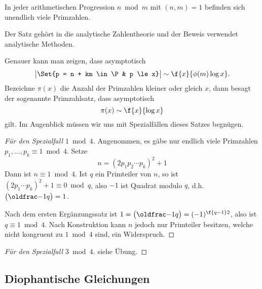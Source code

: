 \begin{st}[Dirichlet] \label{2.17}
	In jeder arithmetischen Progression $n \bmod m$ mit $(n,m) = 1$ befinden sich unendlich viele Primzahlen.
	\begin{note}
		Der Satz gehört in die analytische Zahlentheorie und der Beweis verwendet analytische Methoden.

		Genauer kann man zeigen, dass asymptotisch
		\[
			\big| \Set{p = n + km \in \P & p \le x} \big|
			\sim
			\f {x}{\phi(m) \log x}.
		\]
		Bezeichne $\pi(x)$ die Anzahl der Primzahlen kleiner oder gleich $x$, dann besagt der sogenannte Primzahlsatz, dass asymptotisch
		\[
			\pi(x) \sim \f{x}{\log x}
		\]
		gilt.
		Im Augenblick müssen wir uns mit Spezialfällen dieses Satzes begnügen.
	\end{note}
	\begin{proof}[Für den Spezialfall $1 \bmod 4$]
		Angenommen, es gäbe nur endlich viele Primzahlen $p_1, \dotsc, p_k \equiv 1 \bmod 4$.
		Setze
		\[
			n = (2 p_1 p_2 \dotsb p_k)^2 + 1
		\]
		Dann ist $n \equiv 1 \bmod 4$.
		Ist $q$ ein Primteiler von $n$, so ist $(2p_1\dotsb p_k)^2 + 1 \equiv 0 \bmod q$, also $-1$ ist Quadrat modulo $q$, d.h. $\legsym{-1}{q} = 1$.

		Nach dem ersten Ergänzungssatz ist $1 = \legsym{-1}{q} = (-1)^{\f{q-1}2}$, also ist $q \equiv 1 \bmod 4$.
		Nach Konstruktion kann $n$ jedoch nur Primteiler besitzen, welche nicht kongruent zu $1 \bmod 4$ sind, ein Widerspruch.
	\end{proof}
	\begin{proof}[Für den Spezialfall $3 \bmod 4$]
		siehe Übung.
	\end{proof}
\end{st}

\subsection{Diophantische Gleichungen}

